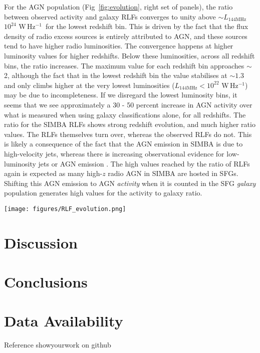 \documentclass[usenatbib,fleqn,letters]{mnras}
\newcommand{\wphz}{$\,$W$\,$Hz$^{-1}$}
\newcommand{\llof}{$L_{\textrm{144MHz}}$}
\begin{document}
For the AGN population (Fig~\ref{fig:evolution}, right set of panels), the ratio between observed activity and galaxy RLFs converges to unity above $\sim$\llof $10^{24}\,$\wphz\ for the lowest redshift bin. This is driven by the fact that the flux density of radio excess sources is entirely attributed to AGN, and these sources tend to have higher radio luminosities. The convergence happens at higher luminosity values for higher redshifts. Below these luminosities, across all redshift bins, the ratio increases. The maximum value for each redshift bin approaches $\sim$2, although the fact that in the lowest redshift bin the value stabilises at $\sim1.3$ and only climbs higher at the very lowest luminosities (\llof $<10^{22}\,$\wphz ) may be due to incompleteness. If we disregard the lowest luminosity bins, it seems that we see approximately a 30 - 50 percent increase in AGN activity over what is measured when using galaxy classifications alone, for all redshifts. The ratio for the SIMBA RLFs shows strong redshift evolution, and much higher ratio values. The RLFs themselves turn over, whereas the observed RLFs do not. This is likely a consequence of the fact that the AGN emission in SIMBA is due to high-velocity jets, whereas there is increasing observational evidence for low-luminosity jets or AGN emission \citep{macfarlane_radio_2021,yue_novel_2024}. The high values reached by the ratio of RLFs again is expected as many high-$z$ radio AGN in SIMBA are hosted in SFGs. Shifting this AGN emission to AGN \textit{activity} when it is counted in the SFG \textit{galaxy} population generates high values for the activity to galaxy ratio. 


\begin{figure*}
    \centering
    \texttt{[image: figures/RLF\_evolution.png]}
    \caption{Caption}
    \label{fig:evolution}
\end{figure*}


\section{Discussion}
\label{sec:discussion}

\section{Conclusions}
\label{sec:conclusions}


\section*{Data Availability}
Reference showyourwork on github
\end{document}
